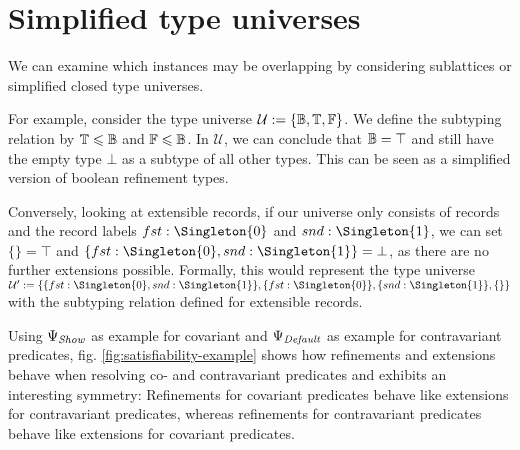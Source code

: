 \section{Simplified type universes}

We can examine which instances may be overlapping by considering sublattices or simplified closed type universes.

For example, consider the type universe $\mathcal{U} := \{ \mathbb{B}, \mathbb{T}, \mathbb{F} \}$.
We define the subtyping relation by $\mathbb{T} \leqslant \mathbb{B}$ and $\mathbb{F} \leqslant \mathbb{B}$.
In $\mathcal{U}$, we can conclude that $\mathbb{B} = \top$ and still have the empty type $\bot$ as a subtype of all other types.
This can be seen as a simplified version of boolean refinement types. \cite{springer}

Conversely, looking at extensible records, if our universe only consists of records and the record labels $fst : \Singleton{0}$ and $snd : \Singleton{1}$, we can set $\{\} = \top$ and $\{ fst : \Singleton{0}, snd : \Singleton{1} \} = \bot$, as there are no further extensions possible.
Formally, this would represent the type universe $\mathcal{U}' := \{ \{ fst : \Singleton{0}, snd : \Singleton{1} \}, \{ fst : \Singleton{0} \}, \{ snd : \Singleton{1} \}, \{\} \}$ with the subtyping relation defined for extensible records.

Using $\Psi_\mathit{Show}$ as example for covariant and $\Psi_\mathit{Default}$ as example for contravariant predicates, fig. \ref{fig:satisfiability-example} shows how refinements and extensions behave when resolving co- and contravariant predicates and exhibits an interesting symmetry:
Refinements for covariant predicates behave like extensions for contravariant predicates, whereas refinements for contravariant predicates behave like extensions for covariant predicates.


